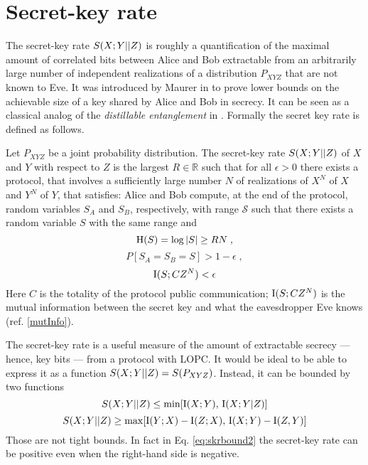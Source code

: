     
\section{Secret-key rate} \label{seckeyrate}
    The secret-key rate $S(X;Y||Z)$ is roughly a quantification of the maximal amount of correlated bits between Alice and Bob extractable from an arbitrarily large number of independent realizations of a distribution $P_{XYZ}$ that are not known to Eve.
    It was introduced by Maurer in \cite{Maur93} to prove lower bounds on the achievable size of a key shared by Alice and Bob in secrecy.
    It can be seen as a classical analog of the \textit{distillable entanglement} in \cite{BDS96}.
    Formally the secret key rate is defined as follows.
    \begin{definition}\cite{Maur93, RW03}
    Let $P_{XYZ}$ be a joint probability distribution. The secret-key rate $S(X;Y||Z)$ of $X$ and $Y$ with respect to $Z$ is the largest $R\in \mathbb{R}$ such that for all $\epsilon > 0$ there exists a protocol, that involves a sufficiently large number $N$ of realizations of $X^N$ of $X$ and $Y^N$ of $Y$, that satisfies:
    Alice and Bob compute, at the end of the protocol, random variables $S_A$ and $S_B$, respectively, with range $\mathcal{S}$ such that there exists a random variable $S$ with the same range and
    \begin{equation*}
    	\operatorname{H}(S) = \log |S| \geq RN\; ,
    \end{equation*}
    \begin{equation*}
    	P[S_A=S_B=S]>1-\epsilon\; ,
    \end{equation*}
    \begin{equation*}
    	\operatorname{I}(S;CZ^N) < \epsilon
    \end{equation*}
	Here $C$ is the totality of the protocol public communication; $\operatorname{I}(S;CZ^N)$ is the mutual information between the secret key and what the eavesdropper Eve knows (ref. \ref{mutInfo}).
    \end{definition}
    
    The secret-key rate is a useful measure of the amount of extractable secrecy --- hence, key bits --- from a protocol with LOPC.
    It would be ideal to be able to express it as a function $S(X;Y||Z) = S(P_{XYZ})$.
    Instead, it can be bounded by two functions\cite{Maur93}
    \begin{equation}\label{eq:skrbound1}
    	S(X;Y||Z) \leq \min[\operatorname{I}(X;Y),\, \operatorname{I}(X;Y|Z)]
    \end{equation}
    \begin{equation}\label{eq:skrbound2}
    	S(X;Y||Z) \geq \max[\operatorname{I}(Y;X) - \operatorname{I}(Z;X),\, \operatorname{I}(X;Y) - \operatorname{I}(Z,Y)]
    \end{equation}
    Those are not tight bounds. In fact in Eq. \ref{eq:skrbound2} the secret-key rate can be positive even when the right-hand side is negative.
    
    
    
